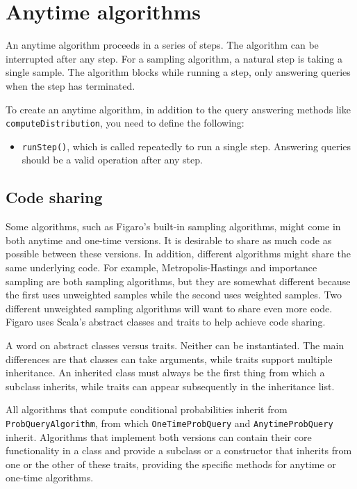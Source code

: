 \section{Anytime algorithms}

An anytime algorithm proceeds in a series of steps. The algorithm can be interrupted after any step. For a sampling algorithm, a natural step is taking a single sample. The algorithm blocks while running a step, only answering queries when the step has terminated.

To create an anytime algorithm, in addition to the query answering methods like
\texttt{computeDistribution}, you need to define the following:

\begin{itemize}
\item \texttt{runStep()}, which is called repeatedly to run a single step. Answering queries should be a valid operation after any step.
\end{itemize}

\subsection{Code sharing}

Some algorithms, such as Figaro's built-in sampling algorithms, might come in both anytime and one-time versions. It is desirable to share as much code as possible between these versions. In addition, different algorithms might share the same underlying code. For example, Metropolis-Hastings and importance sampling are both sampling algorithms, but they are somewhat different because the first uses unweighted samples while the second uses weighted samples. Two different unweighted sampling algorithms will want to share even more code. Figaro uses Scala's abstract classes and traits to help achieve code sharing.

A word on abstract classes versus traits. Neither can be instantiated. The main differences are that classes can take arguments, while traits support multiple inheritance. An inherited class must always be the first thing from which a subclass inherits, while traits can appear subsequently in the inheritance list.

All algorithms that compute conditional probabilities inherit from \texttt{ProbQueryAlgorithm}, from which  \texttt{OneTimeProbQuery} and \texttt{AnytimeProb\-Query} inherit. Algorithms that implement both versions can contain their core functionality in a class and provide a subclass or a constructor that inherits from one or the other of these traits, providing the specific methods for anytime or one-time algorithms.

